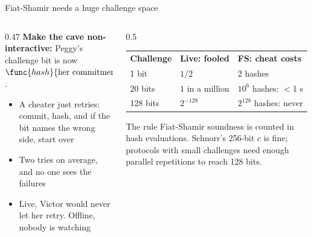 \ifdefined\PRESENTATION\else\PassOptionsToClass{handout}{beamer}\fi\documentclass[aspectratio=169, lualatex]{beamer}
\begin{document}
\begin{frame}{Fiat-Shamir needs a huge challenge space}
	\begin{columns}[c]
		\begin{column}{0.47\textwidth}
			\textbf{Make the cave non-interactive:} Peggy's challenge bit is now $\func{hash}{\text{her commitment}}$.
			\begin{itemize}
				\item A cheater just retries: commit, hash, and if the bit names the wrong side, start over
				\item Two tries on average, and no one sees the failures
				\item Live, Victor would never let her retry. Offline, nobody is watching
			\end{itemize}
		\end{column}
		\begin{column}{0.5\textwidth}
			\begin{center}
				\small
				\begin{tabular}{lll}
					\textbf{Challenge} & \textbf{Live: fooled} & \textbf{FS: cheat costs} \\[0.3em]
					1 bit              & $1/2$                 & 2 hashes                 \\
					20 bits            & $1$ in a million      & $10^6$ hashes: $<$1 s    \\
					128 bits           & $2^{-128}$            & $2^{128}$ hashes: never
				\end{tabular}
			\end{center}
			\begin{alertblock}{The rule}
				Fiat-Shamir soundness is counted in hash evaluations. Schnorr's 256-bit $c$ is fine; protocols with small challenges need enough parallel repetitions to reach 128 bits.
			\end{alertblock}
		\end{column}
	\end{columns}
\end{frame}
\end{document}
